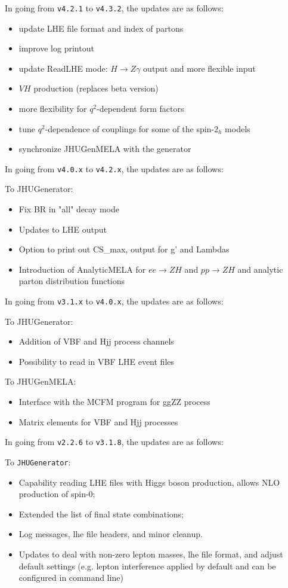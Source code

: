 \documentclass[aps,superscriptaddress,nofootinbib]{revtex4}
\begin{document}
\noindent
In going from \verb|v4.2.1| to \verb|v4.3.2|, the updates are as follows:

\begin{itemize}
\item update LHE file format and index of partons
\item improve log printout
\item update ReadLHE mode: $H\to Z\gamma$ output and more flexible input
\item $VH$ production (replaces beta version)
\item more flexibility for $q^2$-dependent form factors
\item tune $q^2$-dependence of couplings for some of the spin-$2_h$ models
\item synchronize JHUGenMELA with the generator
\end{itemize}

\noindent
In going from \verb|v4.0.x| to \verb|v4.2.x|, the updates are as follows:

To JHUGenerator:
\begin{itemize}
\item Fix BR in "all" decay mode
\item Updates to LHE output
\item Option to print out CS\_max, output for g' and Lambdas
\item Introduction of AnalyticMELA for $ee \to ZH$ and $pp \to ZH$ and analytic parton distribution functions
\end{itemize}


\noindent
In going from \verb|v3.1.x| to \verb|v4.0.x|, the updates are as follows:

To JHUGenerator:
\begin{itemize}
\item Addition of VBF and Hjj process channels
\item Possibility to read in VBF LHE event files
\end{itemize}

To JHUGenMELA:
\begin{itemize}
\item Interface with the MCFM program for ggZZ process
\item Matrix elements for VBF and Hjj processes
\end{itemize}


\noindent
In going from \verb|v2.2.6| to \verb|v3.1.8|, the updates are as follows:

To \verb|JHUGenerator|:
\begin{itemize}
\item Capability reading LHE files with Higgs boson production, allows NLO production of spin-0;
\item Extended the list of final state combinations;
\item Log messages, lhe file headers, and minor cleanup.
\item Updates to deal with non-zero lepton masses, lhe file format, and adjust default settings (e.g. lepton interference applied by default and can be configured in command line)
\end{itemize}
\end{document}

